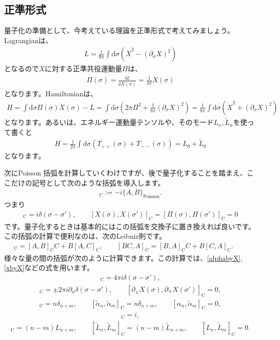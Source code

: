 \documentclass[report,paper=a4, fontsize=12pt, line_length=16cm, number_of_lines=34,dvipdfmx]{jlreq}
\numberwithin{equation}{chapter}
\numberwithin{equation}{section}
\newcommand{\del}{\partial}
\newcommand{\alphat}{\tilde{\alpha}}
\newcommand{\Lt}{\widetilde{L}}
\newcommand{\cbk}[1]{[#1]_{\mathrm{C}}}
\newcommand{\di}{\mathrm{d}}
\begin{document}
\subsection{正準形式}
量子化の準備として、今考えている理論を正準形式で考えてみましょう。
Lagrangianは、
\begin{align}
L=\frac{1}{8\pi}\int \di \sigma \left(\dot{X}^2-(\del_{\sigma}X)^2\right)
\end{align}
となるので$X$に対する正準共役運動量$\Pi$は、
\begin{align}
\Pi(\sigma)=\frac{\delta L}{\delta \dot{X}(\sigma)}=\frac{1}{4\pi} \dot{X}(\sigma)
\end{align}
となります。Hamiltonianは、
\begin{align}
H=\int \di \sigma \Pi(\sigma) \dot {X} (\sigma)-L
=\int \di \sigma (2\pi \Pi^2+\frac{1}{8\pi} (\del_{\sigma}X)^2)
=\frac{1}{8\pi}\int \di \sigma (\dot{X}^2+(\del_{\sigma}X)^2)
\end{align}
となります。あるいは、エネルギー運動量テンソルや、そのモード$L_n,\Lt_n$を使って書くと
\begin{align}
H=\frac{1}{2\pi}\int \di \sigma (T_{++}(\sigma)+T_{--}(\sigma))=L_0+\Lt_0\label{CFT-Hamiltonial}
\end{align}
となります。

次にPoisson 括弧を計算していくわけですが、後で量子化することを踏まえ、ここだけの記号として次のような括弧を導入します。
\begin{align}
\cbk{A,B}:=-i\{A,B\}_{\mathrm{Poisson}}.
\end{align}
つまり
\begin{align}
\cbk{X(\sigma),\Pi(\sigma')}=i\delta(\sigma-\sigma'),\qquad
\cbk{X(\sigma),X(\sigma')}=
\cbk{\Pi(\sigma),\Pi(\sigma')}=0
\end{align}
です。量子化するときは基本的にはこの括弧を交換子に置き換えれば良いです。
この括弧の計算で便利なのは、次のLeibniz則です。
\begin{align}
\cbk{A,BC}=\cbk{A,B}C+B\cbk{A,C},\qquad
\cbk{BC,A}=\cbk{B,A}C+B\cbk{C,A}.\qquad
\end{align}
様々な量の間の括弧が次のように計算できます。この計算では、\eqref{alphabyX},\eqref{xbyX}などの式を用います。
\begin{align}
\cbk{X(\sigma),\dot{X}(\sigma')}=
4\pi i \delta(\sigma-\sigma'),
\end{align}
\begin{align}
\cbk{\del_{\pm}X(\sigma),\del_{\pm}X(\sigma')}
=\pm 2\pi i \del_{\sigma}\delta(\sigma-\sigma'),\qquad
\cbk{\del_{\pm}X(\sigma),\del_{\mp}X(\sigma')}=0,
\end{align}
\begin{align}
\cbk{\alpha_{n},\alpha_{m}}=n\delta_{n+m},\qquad
\cbk{\alphat_{n},\alphat_{m}}=n\delta_{n+m},\qquad
\cbk{\alpha_{n},\alphat_{m}}=0,
\end{align}
\begin{align}
  \cbk{x,p}=i,
\end{align}
\begin{align}
\cbk{L_n,L_m}=(n-m)L_{n+m},\qquad
\cbk{\Lt_n,\Lt_m}=(n-m)\Lt_{n+m},\qquad
\cbk{L_n,\Lt_m}=0.
\end{align}
\end{document}
